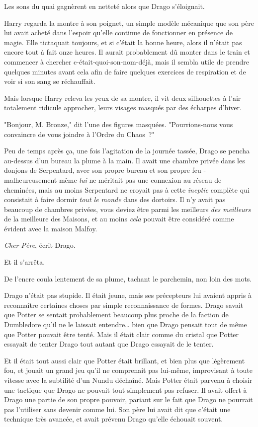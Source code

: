 Les sons du quai gagnèrent en netteté alors que Drago s'éloignait.

Harry regarda la montre à son poignet, un simple modèle mécanique que son père lui avait acheté dans l'espoir qu'elle continue de fonctionner en présence de magie. Elle tictaquait toujours, et si c'était la bonne heure, alors il n'était pas encore tout à fait onze heures. Il aurait probablement dû monter dans le train et commencer à chercher c-était-quoi-son-nom-déjà, mais il sembla utile de prendre quelques minutes avant cela afin de faire quelques exercices de respiration et de voir si son sang se réchauffait.

Mais lorsque Harry releva les yeux de sa montre, il vit deux silhouettes à l'air totalement ridicule approcher, leurs visages masqués par des écharpes d'hiver.

"Bonjour, M. Bronze," dit l'une des figures masquées. "Pourrions-nous vous convaincre de vous joindre à l'Ordre du Chaos~?"


Peu de temps après ça, une fois l'agitation de la journée tassée, Drago se pencha au-dessus d'un bureau la plume à la main. Il avait une chambre privée dans les donjons de Serpentard, avec son propre bureau et son propre feu - malheureusement même \emph{lui} ne méritait pas une connexion au réseau de cheminées, mais au moins Serpentard ne croyait pas à cette \emph{ineptie} complète qui consistait à faire dormir \emph{tout le monde} dans des dortoirs. Il n'y avait pas beaucoup de chambres privées, vous deviez être parmi les meilleurs \emph{des meilleurs} de la meilleure des Maisons, et au moins \emph{cela} pouvait être considéré comme évident avec la maison Malfoy.

\emph{Cher Père}, écrit Drago.

Et il s'arrêta.

De l'encre coula lentement de sa plume, tachant le parchemin, non loin des mots.

Drago n'était pas stupide. Il était jeune, mais ses précepteurs lui avaient appris à reconnaître certaines choses par simple reconnaissance de formes. Drago savait que Potter se sentait probablement beaucoup plus proche de la faction de Dumbledore qu'il ne le laissait entendre… bien que Drago pensait tout de même que Potter pouvait être tenté. Mais il était clair comme du cristal que Potter essayait de tenter Drago tout autant que Drago essayait de le tenter.

Et il était tout aussi clair que Potter était brillant, et bien plus que légèrement fou, et jouait un grand jeu qu'il ne comprenait pas lui-même, improvisant à toute vitesse avec la subtilité d'un Nundu déchaîné. Mais Potter était parvenu à choisir une tactique que Drago ne pouvait tout simplement pas refuser. Il avait offert à Drago une partie de son propre pouvoir, pariant sur le fait que Drago ne pourrait pas l'utiliser sans devenir comme lui. Son père lui avait dit que c'était une technique très avancée, et avait prévenu Drago qu'elle échouait souvent.

